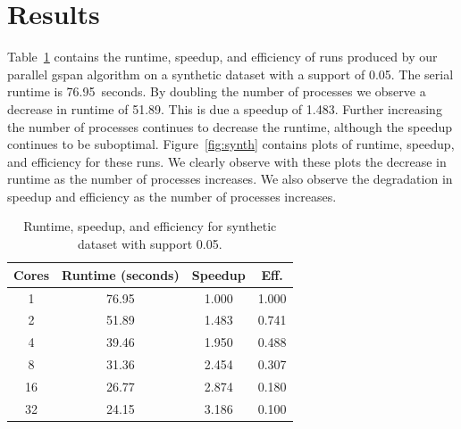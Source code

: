 \section{Results}
\label{sec:results}

Table~\ref{tab:synth} contains the runtime, speedup, and efficiency of runs
produced by our parallel gspan algorithm on a synthetic dataset with
a support of 0.05. The serial runtime is 76.95~seconds. By doubling
the number of processes we observe a decrease in runtime of 51.89. This
is due a speedup of 1.483. Further increasing the number of processes continues
to decrease the runtime, although the speedup continues to be suboptimal.
Figure~\ref{fig:synth} contains plots of runtime, speedup, and efficiency for
these runs. We clearly observe with these plots the decrease in runtime as the
number of processes increases. We also observe the degradation in speedup and
efficiency as the number of processes increases.


\begin{table}[H]
\centering
\begin{tabular}{cccc}
\hline
Cores & Runtime (seconds) & Speedup &  Eff.  \\
\hline
1    &   76.95   &  1.000 &     1.000  \\
2    &   51.89   &  1.483 &     0.741  \\
4    &   39.46   &  1.950 &     0.488  \\
8    &   31.36   &  2.454 &     0.307  \\
16   &   26.77   &  2.874 &     0.180  \\
32   &   24.15   &  3.186 &     0.100  \\
\hline
\end{tabular}
\caption{Runtime, speedup, and efficiency for synthetic dataset with support
         0.05.}
\label{tab:synth}
\end{table}

